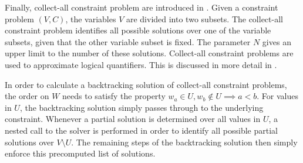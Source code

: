     Finally, collect-all constraint problem are introduced in
    .
    Given a constraint problem $(V,C)$, the variables $V$ are divided into
    two subsets.
    The collect-all constraint problem identifies all possible solutions over
    one of the variable subsets, given that the other variable subset is fixed.
    The parameter $N$ gives an upper limit to the number of these solutions.
    Collect-all constraint problems are used to approximate logical quantifiers.
    This is discussed in more detail in .

    In order to calculate a backtracking solution of collect-all constraint
    problems, the order on $W$ needs to satisfy the property
    $w_a\in U,w_b\notin U\implies a<b$.
    For values in $U$, the backtracking solution simply passes through to the
    underlying constraint.
    Whenever a partial solution is determined over all values in $U$, a nested
    call to the solver is performed in order to identify all possible partial
    solutions over $V\setminus U$.
    The remaining steps of the backtracking solution then simply enforce this
    precomputed list of solutions.

